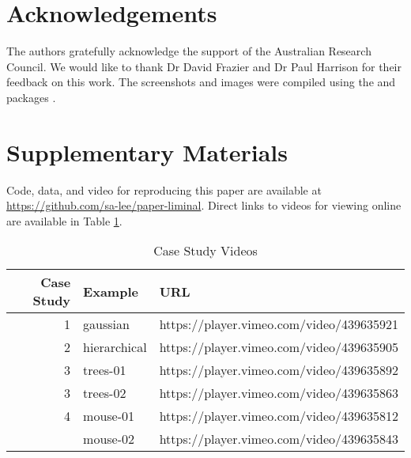 \documentclass[article,notitle]{jdssv}
\begin{document}
\hypertarget{acknowledgements}{%
\section*{Acknowledgements}\label{acknowledgements}}

The authors gratefully acknowledge the support of the Australian Research Council.
We would like to thank Dr David Frazier and Dr Paul Harrison for
their feedback on this work. The screenshots and images were compiled using the
 and  packages \citep{r-cowplot, Wickham2016-gz}.

\hypertarget{supplementary-materials}{%
\section*{Supplementary Materials}\label{supplementary-materials}}

Code, data, and video for reproducing this paper are available at \url{https://github.com/sa-lee/paper-liminal}. Direct links to videos for viewing
online are available in Table \ref{tab:vimeo}.

\begin{table}

\caption{\label{tab:vimeo}Case Study Videos}
\centering
\begin{tabular}[t]{rll}
\toprule
Case Study & Example & URL\\
\midrule
1 & gaussian & https://player.vimeo.com/video/439635921\\
2 & hierarchical & https://player.vimeo.com/video/439635905\\
3 & trees-01 & https://player.vimeo.com/video/439635892\\
3 & trees-02 & https://player.vimeo.com/video/439635863\\
4 & mouse-01 & https://player.vimeo.com/video/439635812\\
\addlinespace
4 & mouse-02 & https://player.vimeo.com/video/439635843\\
\bottomrule
\end{tabular}
\end{table}

\renewcommand\refname{References}

\end{document}
